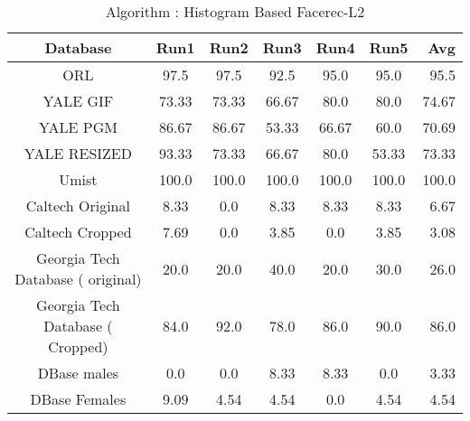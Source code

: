 \documentclass[10pt,a4paper]{article}
\begin{document}
\begin{center}
\begin{table}
\caption{Algorithm : Histogram Based Facerec-L2 }
\centering
\begin{tabular}{| c | c | c | c | c | c | r | } \hline 
Database & Run1 & Run2 & Run3 & Run4 & Run5 & Avg  \\  
\hline
ORL & 97.5 & 97.5 & 92.5 & 95.0 & 95.0 & 95.5 \\
\hline
YALE GIF & 73.33 & 73.33 & 66.67 & 80.0 & 80.0 & 74.67 \\
\hline
YALE PGM & 86.67 & 86.67 & 53.33 & 66.67 & 60.0 & 70.69 \\
\hline
YALE RESIZED & 93.33 & 73.33 & 66.67 & 80.0 & 53.33 & 73.33 \\
\hline
Umist & 100.0 & 100.0 & 100.0 & 100.0 & 100.0 & 100.0 \\
\hline
Caltech Original & 8.33 & 0.0 & 8.33 & 8.33 & 8.33 & 6.67 \\
\hline
Caltech Cropped & 7.69 & 0.0 & 3.85 & 0.0 & 3.85 & 3.08 \\
\hline
Georgia Tech Database ( original) & 20.0 & 20.0 & 40.0 & 20.0 & 30.0 & 26.0 \\
\hline
Georgia Tech Database ( Cropped) & 84.0 & 92.0 & 78.0 & 86.0 & 90.0 & 86.0 \\
\hline
DBase males & 0.0 & 0.0 & 8.33 & 8.33 & 0.0 & 3.33 \\
\hline
DBase Females & 9.09 & 4.54 & 4.54 & 0.0 & 4.54 & 4.54 \\
\hline
\end{tabular}
\end{table}



\end{center}
\end{document}

